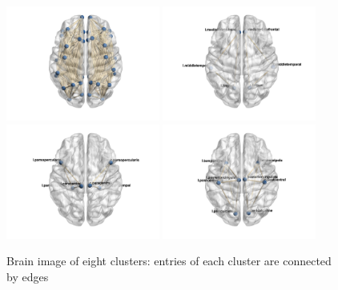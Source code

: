 \documentclass[11pt]{article}
\theoremstyle{plain}
\theoremstyle{definition}
\begin{document}
\begin{figure}[H]
  \centering
 \includegraphics[width = 0.45\textwidth]{brain1.jpg}
 \includegraphics[width = 0.45\textwidth]{brain2.jpg}
 \includegraphics[width = 0.45\textwidth]{brain3.jpg}
 \includegraphics[width = 0.45\textwidth]{brain4.jpg}
  \label{figure:brain image}
  \caption{Brain image of eight clusters: entries of each cluster are connected by edges}
\end{figure}



\end{document}
